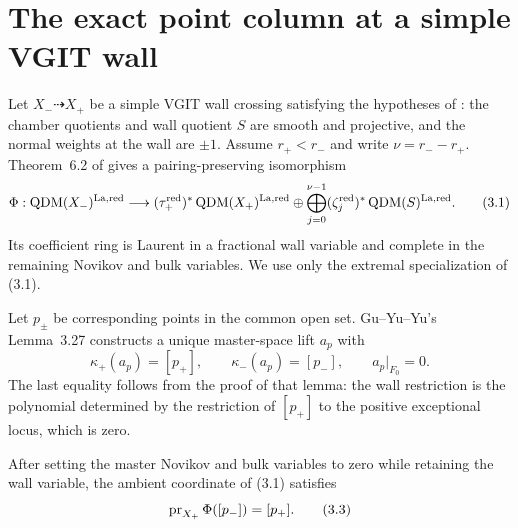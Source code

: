 \section{The exact point column at a simple VGIT wall}
\label{sec:simple-wall}

Let \(X_-\dashrightarrow X_+\) be a simple VGIT wall crossing satisfying the
hypotheses of \cite[Definition~3.2]{GuYuYu}: the chamber quotients and wall
quotient \(S\) are smooth and projective, and the normal weights at the wall
are \(\pm1\).  Assume \(r_+<r_-\) and write \(\nu=r_--r_+\).
Theorem~6.2 of \cite{GuYuYu} gives a pairing-preserving isomorphism
\[
 \Phi:\operatorname{QDM}(X_-)^{\mathrm{La,red}}
 \longrightarrow
 (\tau_+^{\mathrm{red}})^*\operatorname{QDM}(X_+)^{\mathrm{La,red}}
 \oplus\bigoplus_{j=0}^{\nu-1}
 (\zeta_j^{\mathrm{red}})^*\operatorname{QDM}(S)^{\mathrm{La,red}}.       \tag{3.1}
\]
Its coefficient ring is Laurent in a fractional wall variable and complete
in the remaining Novikov and bulk variables.  We use only the extremal
specialization of (3.1).

Let \(p_\pm\) be corresponding points in the common open set.  Gu--Yu--Yu's
Lemma~3.27 constructs a unique master-space lift \(a_p\) with
\[
 \kappa_+(a_p)=[p_+],\qquad
 \kappa_-(a_p)=[p_-],\qquad
 a_p|_{F_0}=0.                                             \tag{3.2}
\]
The last equality follows from the proof of that lemma: the wall restriction
is the polynomial determined by the restriction of \([p_+]\) to the positive
exceptional locus, which is zero.

\begin{theorem}
\label{thm:simple-wall-point-column}
After setting the master Novikov and bulk variables to zero while retaining
the wall variable, the ambient coordinate of (3.1) satisfies
\[
 \operatorname{pr}_{X_+}\Phi([p_-])=[p_+].                              \tag{3.3}
\]
\end{theorem}

